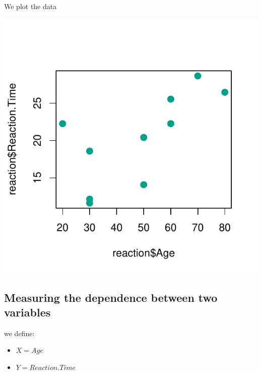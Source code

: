 \documentclass[
]{article}
\newenvironment{Shaded}{\begin{snugshade}}{\end{snugshade}}
\newcommand{\AttributeTok}[1]{\textcolor[rgb]{0.77,0.63,0.00}{#1}}
\newcommand{\DecValTok}[1]{\textcolor[rgb]{0.00,0.00,0.81}{#1}}
\newcommand{\FunctionTok}[1]{\textcolor[rgb]{0.00,0.00,0.00}{#1}}
\newcommand{\NormalTok}[1]{#1}
\newcommand{\SpecialCharTok}[1]{\textcolor[rgb]{0.00,0.00,0.00}{#1}}
\providecommand{\tightlist}{%
  \setlength{\itemsep}{0pt}\setlength{\parskip}{0pt}}
\begin{document}
We plot the data

\begin{Shaded}
\end{Shaded}

\begin{center}\includegraphics{perm_files/figure-latex/unnamed-chunk-4-1} \end{center}

\hypertarget{measuring-the-dependence-between-two-variables}{%
\subsection{Measuring the dependence between two
variables}\label{measuring-the-dependence-between-two-variables}}

we define:

\begin{itemize}
\tightlist
\item
  \(X=Age\)\\
\item
  \(Y=Reaction.Time\)
\end{itemize}
\end{document}
